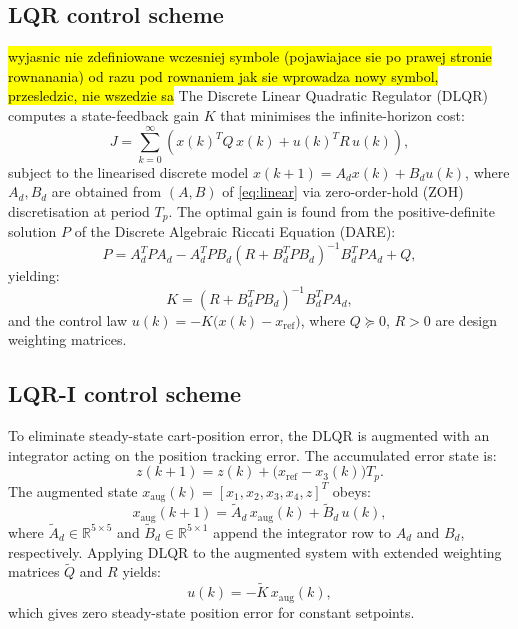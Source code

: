 \documentclass[twocolumn]{svjour3}
\begin{document}
\subsection{LQR control scheme}
\hl{wyjasnic nie zdefiniowane wczesniej symbole (pojawiajace sie po prawej stronie rownanania) od razu pod rownaniem jak sie wprowadza nowy symbol, przesledzic, nie wszedzie sa}
The Discrete Linear Quadratic Regulator (DLQR) computes a
state-feedback gain $K$ that minimises the infinite-horizon cost:
\begin{equation}
J = \sum_{k=0}^{\infty}\!\left(x(k)^T Q\,x(k) + u(k)^T R\,u(k)\right),
\label{eq:lqr_cost}
\end{equation}
subject to the linearised discrete model $x(k{+}1)=A_dx(k)+B_du(k)$,
where $A_d,B_d$ are obtained from $(A,B)$ of \eqref{eq:linear} via zero-order-hold (ZOH)
discretisation at period $T_p$. The optimal gain is found from the positive-definite solution $P$ of the Discrete Algebraic
Riccati Equation (DARE):
\begin{equation}
P = A_d^T P A_d - A_d^T P B_d(R+B_d^T P B_d)^{-1}B_d^T P A_d + Q,
\end{equation}
yielding:
\begin{equation}
K = (R + B_d^T P B_d)^{-1}B_d^T P A_d,
\end{equation}
and the control law $u(k) = -K\bigl(x(k) - x_\mathrm{ref}\bigr)$,
where $Q\succeq 0$, $R>0$ are design weighting matrices.

\subsection{LQR-I control scheme}

To eliminate steady-state cart-position error, the DLQR is augmented with an integrator
acting on the position tracking error. The accumulated error state is:
\begin{equation}
z(k+1) = z(k) + \bigl(x_\mathrm{ref} - x_3(k)\bigr)T_p.
\end{equation}
The augmented state $x_\mathrm{aug}(k)=[x_1,x_2,x_3,x_4,z]^T$ obeys:
\begin{equation}
x_\mathrm{aug}(k{+}1) = \tilde{A}_d\,x_\mathrm{aug}(k) + \tilde{B}_d\,u(k),
\end{equation}
where $\tilde{A}_d\in\mathbb{R}^{5\times 5}$ and $\tilde{B}_d\in\mathbb{R}^{5\times 1}$
append the integrator row to $A_d$ and $B_d$, respectively. Applying DLQR to the augmented
system with extended weighting matrices $\tilde{Q}$ and $R$ yields:
\begin{equation}
u(k) = -\tilde{K}\,x_\mathrm{aug}(k),
\end{equation}
which gives zero steady-state position error for constant setpoints.
\end{document}
